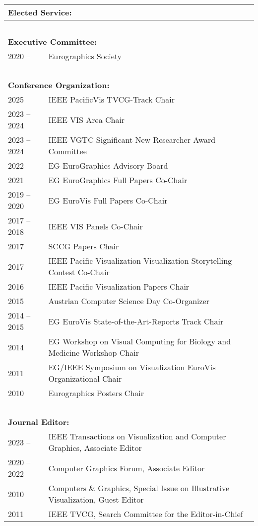 \documentclass[a4paper,11pt]{letter}
\begin{document}
\begin{tabular}{l| l}
\multicolumn{2}{l}{\large{\textbf{Elected Service:}}} \\
\hline
\multicolumn{2}{l}{\textbf{~}} \\
\multicolumn{2}{l}{\textbf{Executive Committee:}} \\
2020 -- & Eurographics Society \\
\hline
\multicolumn{2}{l}{\textbf{~}} \\
\multicolumn{2}{l}{\textbf{Conference Organization:}} \\
2025  & IEEE PacificVis TVCG-Track Chair \\
2023 -- 2024 & IEEE VIS Area Chair \\
2023 -- 2024 & IEEE VGTC Significant New Researcher Award Committee \\
2022  & EG EuroGraphics Advisory Board \\
2021  & EG EuroGraphics Full Papers Co-Chair \\
2019 -- 2020  & EG EuroVis Full Papers Co-Chair \\
2017 -- 2018 & IEEE VIS Panels Co-Chair \\
2017  & SCCG Papers Chair \\
2017  & IEEE Pacific Visualization Visualization Storytelling Contest Co-Chair \\
2016  & IEEE Pacific Visualization Papers Chair \\
2015  & Austrian Computer Science Day Co-Organizer \\
2014 -- 2015 & EG EuroVis State-of-the-Art-Reports Track Chair \\
2014  & EG Workshop on Visual Computing for Biology and Medicine Workshop Chair \\
2011  & EG/IEEE Symposium on Visualization EuroVis Organizational Chair \\
2010  & Eurographics Posters Chair \\
\hline
\multicolumn{2}{l}{\textbf{~}} \\
\multicolumn{2}{l}{\textbf{Journal Editor:}} \\
2023 -- & IEEE Transactions on Visualization and Computer Graphics, Associate Editor \\
2020 -- 2022 & Computer Graphics Forum, Associate Editor \\
2010 & Computers \& Graphics, Special Issue on Illustrative Visualization, Guest Editor \\
2011 & IEEE TVCG, Search Committee for the Editor-in-Chief \\

\end{tabular}
\end{document}
